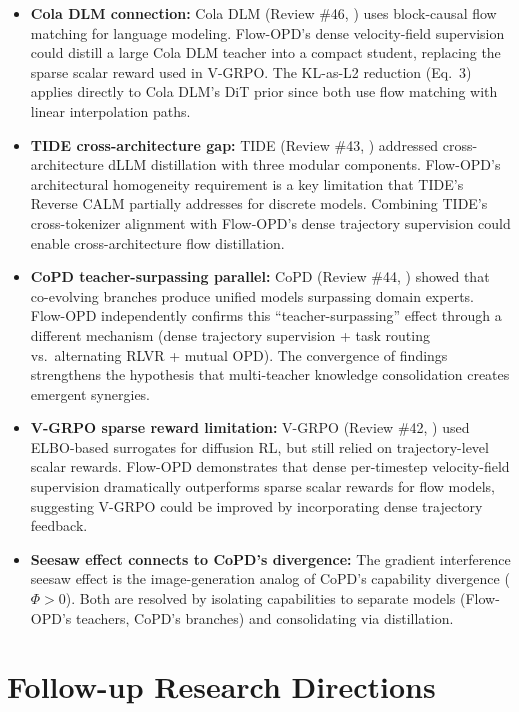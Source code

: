 \documentclass[11pt]{article}
\begin{document}
\begin{itemize}
    \item \textbf{Cola DLM connection:} Cola DLM (Review \#46, \cite{coladlm}) uses block-causal flow matching for language modeling. Flow-OPD's dense velocity-field supervision could distill a large Cola DLM teacher into a compact student, replacing the sparse scalar reward used in V-GRPO. The KL-as-L2 reduction (Eq.\ 3) applies directly to Cola DLM's DiT prior since both use flow matching with linear interpolation paths.
    \item \textbf{TIDE cross-architecture gap:} TIDE (Review \#43, \cite{tide}) addressed cross-architecture dLLM distillation with three modular components. Flow-OPD's architectural homogeneity requirement is a key limitation that TIDE's Reverse CALM partially addresses for discrete models. Combining TIDE's cross-tokenizer alignment with Flow-OPD's dense trajectory supervision could enable cross-architecture flow distillation.
    \item \textbf{CoPD teacher-surpassing parallel:} CoPD (Review \#44, \cite{copd}) showed that co-evolving branches produce unified models surpassing domain experts. Flow-OPD independently confirms this ``teacher-surpassing'' effect through a different mechanism (dense trajectory supervision + task routing vs.\ alternating RLVR + mutual OPD). The convergence of findings strengthens the hypothesis that multi-teacher knowledge consolidation creates emergent synergies.
    \item \textbf{V-GRPO sparse reward limitation:} V-GRPO (Review \#42, \cite{vgrpo}) used ELBO-based surrogates for diffusion RL, but still relied on trajectory-level scalar rewards. Flow-OPD demonstrates that dense per-timestep velocity-field supervision dramatically outperforms sparse scalar rewards for flow models, suggesting V-GRPO could be improved by incorporating dense trajectory feedback.
    \item \textbf{Seesaw effect connects to CoPD's divergence:} The gradient interference seesaw effect is the image-generation analog of CoPD's capability divergence ($\Phi > 0$). Both are resolved by isolating capabilities to separate models (Flow-OPD's teachers, CoPD's branches) and consolidating via distillation.
\end{itemize}

\section{Follow-up Research Directions}
\end{document}
